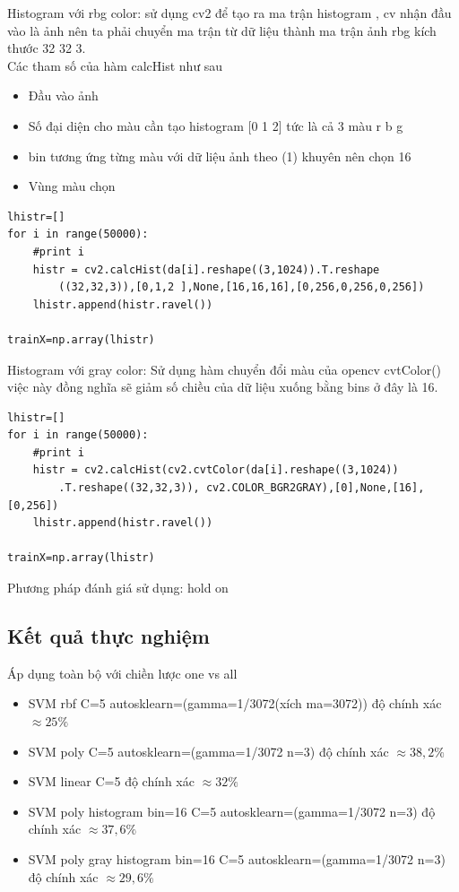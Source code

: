 \documentclass[a4paper,12pt]{report}
\begin{document}
Histogram với rbg color: sử dụng cv2 để tạo ra ma trận histogram , cv nhận đầu vào là ảnh nên ta phải chuyển ma trận từ dữ liệu thành ma trận ảnh rbg kích thước 32 32 3. \\
Các tham số của hàm  calcHist như sau 
\begin{itemize}
\item Đầu vào ảnh 
\item Số đại diện cho màu cần tạo histogram [0 1 2] tức là cả 3 màu r b g
\item bin tương ứng từng màu với dữ liệu ảnh theo (1) khuyên nên chọn 16 
\item Vùng màu chọn 
\end{itemize}
\begin{lstlisting}
lhistr=[]
for i in range(50000):
    #print i
    histr = cv2.calcHist(da[i].reshape((3,1024)).T.reshape
    	((32,32,3)),[0,1,2 ],None,[16,16,16],[0,256,0,256,0,256])        
    lhistr.append(histr.ravel())

trainX=np.array(lhistr)
\end{lstlisting}
Histogram với gray color:
Sử dụng hàm chuyển đổi màu của opencv cvtColor() việc này đồng nghĩa sẽ giảm số chiều của dữ liệu xuống bằng bins ở đây là 16.
\begin{lstlisting}
lhistr=[]
for i in range(50000):
    #print i
    histr = cv2.calcHist(cv2.cvtColor(da[i].reshape((3,1024))
    	.T.reshape((32,32,3)), cv2.COLOR_BGR2GRAY),[0],None,[16],[0,256])
    lhistr.append(histr.ravel())

trainX=np.array(lhistr)
\end{lstlisting}
Phương pháp đánh giá sử dụng: hold on
\subsection{Kết quả thực nghiệm}
Áp dụng toàn bộ với chiền lược one vs all
\begin{itemize}
\item SVM rbf C=5 autosklearn=(gamma=1/3072(xích ma=3072)) độ chính xác $\approx 25 \%$  
\item SVM poly C=5 autosklearn=(gamma=1/3072 n=3) độ chính xác $\approx 38,2 \%$
\item SVM linear C=5  độ chính xác $\approx 32 \%$    
\item SVM poly histogram bin=16 C=5 autosklearn=(gamma=1/3072 n=3) độ chính xác $\approx 37,6 \%$
\item SVM poly gray histogram bin=16 C=5 autosklearn=(gamma=1/3072 n=3) độ chính xác $\approx 29,6 \%$
\end{itemize}
\end{document}

